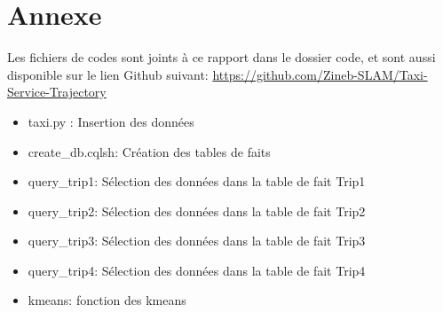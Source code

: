 \documentclass[]{report}
\begin{document}
	\pagebreak
	
	\section{Annexe}
	Les fichiers de codes sont joints à ce rapport dans le dossier code, et sont aussi disponible sur le lien Github suivant: \url{https://github.com/Zineb-SLAM/Taxi-Service-Trajectory}
	\begin{itemize}
		\item taxi.py : Insertion des données
		\item create\_db.cqlsh: Création des tables de faits 
		\item query\_trip1: Sélection des données dans la table de fait Trip1
		\item query\_trip2: Sélection des données dans la table de fait Trip2
		\item query\_trip3: Sélection des données dans la table de fait Trip3
		\item query\_trip4: Sélection des données dans la table de fait Trip4
		\item kmeans: fonction des kmeans
	\end{itemize}
\end{document}
